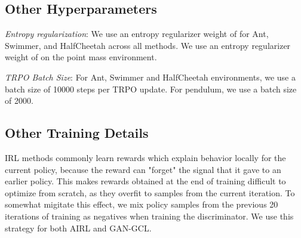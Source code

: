 \documentclass{article} \usepackage{iclr2018_conference,times}
\begin{document}
\subsection{Other Hyperparameters}
\textit{Entropy regularization}: We use an entropy regularizer weight of  for Ant, Swimmer, and HalfCheetah across all methods. We use an entropy regularizer weight of  on the point mass environment.

\textit{TRPO Batch Size}: For Ant, Swimmer and HalfCheetah environments, we use a batch size of 10000 steps per TRPO update. For pendulum, we use a batch size of 2000.

\subsection{Other Training Details}
IRL methods commonly learn rewards which explain behavior locally for the current policy, because the reward can "forget" the signal that it gave to an earlier policy. This makes rewards obtained at the end of training difficult to optimize from scratch, as they overfit to samples from the current iteration. To somewhat migitate this effect, we mix policy samples from the previous 20 iterations of training as negatives when training the discriminator. We use this strategy for both AIRL and GAN-GCL.




 
\end{document}
